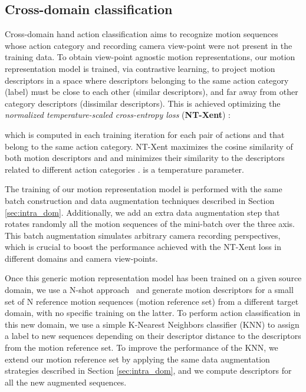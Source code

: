 \documentclass[letterpaper, 10 pt, conference]{ieeeconf}
\begin{document}
\subsection{Cross-domain classification}\label{sec:xdom}

Cross-domain hand action classification aims to recognize motion sequences whose action category and recording camera view-point were not present in the training data. To obtain view-point agnostic motion representations, our motion representation model  is trained, via contrastive learning, to project motion descriptors in a space where
descriptors belonging to the same action category (label) must be close to each other (similar descriptors), and far away from other category descriptors (dissimilar descriptors).
This is achieved optimizing 
the \textit{normalized temperature-scaled cross-entropy loss} (\textbf{NT-Xent}) \cite{chen2020simple}:


\noindent which is computed in each training iteration for each pair of actions  and  that belong to the same action category. 
NT-Xent maximizes the cosine similarity  of both motion descriptors  and  and minimizes their similarity to the descriptors related to different action categories .  is a temperature parameter.



The training of our motion representation model is performed with the same batch construction and data augmentation techniques described in Section \ref{sec:intra_dom}. Additionally, we add an extra data augmentation step that rotates randomly all the motion sequences of the mini-batch over the three axis. This batch augmentation simulates arbitrary camera recording perspectives, which is crucial to boost the performance achieved with the NT-Xent loss in different domains and camera view-points. 


Once this generic motion representation model has been trained on a given source domain, we use a N-shot approach~\cite{wang2019simpleshot} and generate motion descriptors for a small set of N reference motion sequences (motion reference set) from a different target domain, with no specific training on the latter. To perform action classification in this new domain, 
we use a simple K-Nearest Neighbors classifier (KNN) to assign a label to new sequences depending on their descriptor distance to the descriptors from the motion reference set. To improve the performance of the KNN, 
we extend our motion reference set by applying the same data augmentation strategies described in Section \ref{sec:intra_dom}, and we compute descriptors for all the new augmented sequences. 
\end{document}
